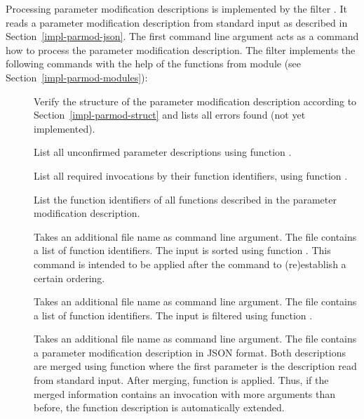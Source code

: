 Processing parameter modification descriptions is implemented by the filter . It reads a parameter
modification description from standard input as described in Section~\ref{impl-parmod-json}. The first command line 
argument acts as a command how to process the parameter modification description. The filter implements the following
commands with the help of the functions from module   (see Section~\ref{impl-parmod-modules}):
\begin{description}

\item[]
Verify the structure of the parameter modification description 
according to Section~\ref{impl-parmod-struct} and lists all errors found (not yet implemented).

\item[] 
List all unconfirmed parameter descriptions using function .

\item[]
List all required invocations by their function identifiers, using function .

\item[]
List the function identifiers of all functions described in the parameter modification description.

\item[]
Takes an additional file name as command line argument. The file contains a list of function identifiers.
The input is sorted using function . This command
is intended to be applied after the  command to (re)establish a certain ordering.

\item[]
Takes an additional file name as command line argument. The file contains a list of function identifiers.
The input is filtered using function .

\item[]
Takes an additional file name as command line argument. The file contains a parameter modification description 
in JSON format. Both descriptions are merged using function 
where the first parameter is the description read from standard input.
After merging, function  is applied.
Thus, if the merged information contains
an invocation with more arguments than before, the function description is automatically extended.


\end{description}

